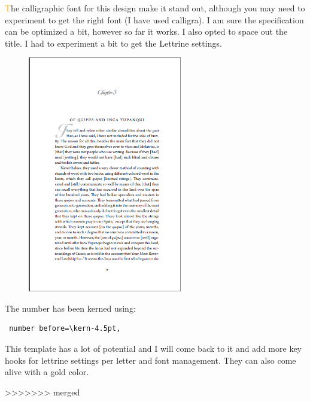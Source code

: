 \lettrine{\textcolor{orange}{T}}{}he calligraphic font for this design make it stand out, although you may need to experiment to get the right font (I have used calligra). I am sure the specification can be optimized a bit, however so far it works. I also opted to space out the title. I had to experiment a bit to get the Lettrine settings.
\medskip
\begin{figure}[ht]
\centering
\includegraphics[width=0.6\textwidth]{./chapters/chapter06}
\end{figure}

The number has been kerned using:

\begin{lstlisting}
 number before=\kern-4.5pt,
\end{lstlisting}

This template has a lot of potential and I will come back to it and add more key hooks for lettrine settings per letter and font management. They can also come alive with a gold color.

>>>>>>> merged
